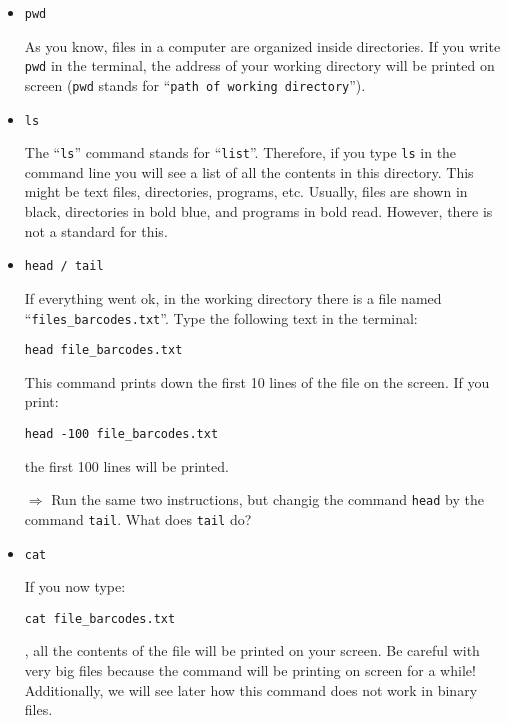 \documentclass[11pt]{article}
\begin{document}
\begin{itemize}
\item \texttt{pwd}

As you know, files in a computer are organized inside directories. If you write \texttt{pwd} in the terminal, the address of your working directory will be printed on screen (\texttt{pwd} stands for ``\texttt{path of working directory}'').

\item \texttt{ls}

The ``\texttt{ls}'' command stands for ``\texttt{list}''. Therefore, if you type \texttt{ls} in the command line you will see a list of all the contents in this directory. This might be text files, directories, programs, etc. Usually, files are shown in black, directories in bold blue, and programs in bold read. However, there is not a standard for this. 

\item \texttt{head / tail}

If everything went ok, in the working directory there is a file named ``\texttt{files\_barcodes.txt}''. Type the following text in the terminal: 

\begin{verbatim}
head file_barcodes.txt
\end{verbatim}

This command prints down the first 10 lines of the file on the screen. If you print:

\begin{verbatim}
head -100 file_barcodes.txt
\end{verbatim}

the first 100 lines will be printed. 

\vspace{1em}
\hrulefill

$\Rightarrow$ Run the same two instructions, but changig the command  \texttt{head} by the command \texttt{tail}. What does \texttt{tail} do?

\hrulefill
\vspace{1em}


\item \texttt{cat}

If you now type:

\begin{verbatim}
cat file_barcodes.txt
\end{verbatim}
, all the contents of the file will be printed on your screen. Be careful with very big files because the command will be printing on screen for a while! Additionally, we will see later how this command does not work in binary files. 


\end{itemize}
\end{document}
